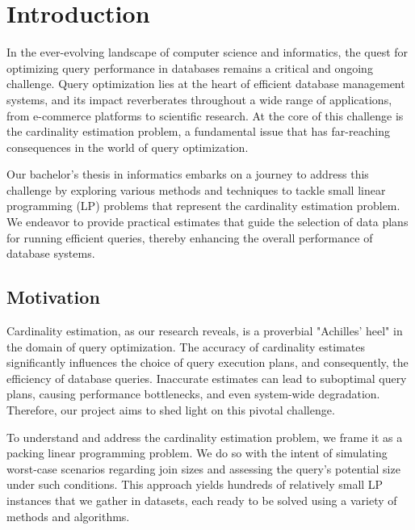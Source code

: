 

\chapter{Introduction}\label{chapter:introduction}
In the ever-evolving landscape of computer science and informatics, 
the quest for optimizing query performance in databases remains a 
critical and ongoing challenge. Query optimization lies at the heart 
of efficient database management systems, and its impact reverberates 
throughout a wide range of applications, from e-commerce platforms to 
scientific research. At the core of this challenge is the cardinality 
estimation problem, a fundamental issue that has far-reaching consequences 
in the world of query optimization.

Our bachelor's thesis in informatics embarks on a journey to 
address this challenge by exploring various methods and techniques 
to tackle small linear programming (LP) problems that represent 
the cardinality estimation problem. We endeavor to provide practical 
estimates that guide the selection of data plans for running efficient
 queries, thereby enhancing the overall performance of database systems.

\section{Motivation}

Cardinality estimation, as our research reveals, is a proverbial 
"Achilles' heel" in the domain of query optimization. 
The accuracy of cardinality estimates significantly influences 
the choice of query execution plans, and consequently, 
the efficiency of database queries. Inaccurate estimates 
can lead to suboptimal query plans, causing performance bottlenecks, 
and even system-wide degradation. Therefore, our project aims to 
shed light on this pivotal challenge.

To understand and address the cardinality estimation problem, 
we frame it as a packing linear programming problem. We do so 
with the intent of simulating worst-case scenarios regarding 
join sizes and assessing the query's potential size under such 
conditions. This approach yields hundreds of relatively small 
LP instances that we gather in datasets, each ready to be solved 
using a variety of methods and algorithms.

